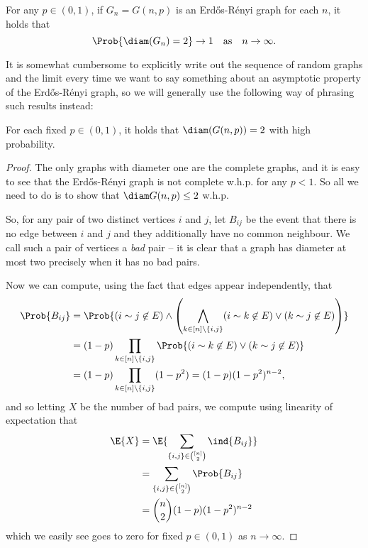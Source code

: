 \documentclass[nobib]{tufte-handout}
\begin{document}
\begin{proposition}
  For any $p \in (0,1)$, if $G_n = G(n,p)$ is an Erd\H{o}s-Rényi graph for each $n$, it holds that
  $$\Prob{\diam(G_n) = 2} \to 1\quad\text{as}\quad n \to \infty.$$
\end{proposition}

It is somewhat cumbersome to explicitly write out the sequence of random graphs and the limit every time we want to say something about an asymptotic property of the Erd\H{o}s-Rényi graph, so we will generally use the following way of phrasing such results instead:

\begin{proposition}
  For each fixed $p \in (0,1)$, it holds that $\diam(G(n,p)) = 2$ with high probability.

  \begin{proof}
    The only graphs with diameter one are the complete graphs, and it is easy to see that the Erd\H{o}s-Rényi graph is not complete w.h.p. for any $p < 1$. So all we need to do is to show that $\diam G(n,p) \leq 2$ w.h.p.

    So, for any pair of two distinct vertices $i$ and $j$, let $B_{ij}$ be the event that there is no edge between $i$ and $j$ and they additionally have no common neighbour. We call such a pair of vertices a \emph{bad} pair -- it is clear that a graph has diameter at most two precisely when it has no bad pairs.
    
    Now we can compute, using the fact that edges appear independently, that
    \begin{align*}
      \Prob{B_{ij}} &= \Prob{\left(i \sim j \not\in E\right) \wedge \left(\bigwedge_{k \in [n]\setminus \{i,j\}} (i \sim k \not\in E)\vee (k \sim j \not \in E)\right)}\\
      &= (1-p)\prod_{k \in [n] \setminus \{i,j\}} \Prob{(i \sim k \not\in E)\vee (k \sim j \not \in E)}\\
      &= (1-p)\prod_{k \in [n] \setminus \{i,j\}} (1 - p^2) = (1-p)(1 - p^2)^{n-2},
    \end{align*}
    and so letting $X$ be the number of bad pairs, we compute using linearity of expectation that
    \begin{align*}
      \E{X} &= \E{\sum_{\{i,j\} \in \binom{[n]}{2}} \ind{B_{ij}}}\\
      &= \sum_{\{i,j\} \in \binom{[n]}{2}} \Prob{B_{ij}}\\
      &= \binom{n}{2}(1-p)(1 - p^2)^{n-2}
    \end{align*}
    which we easily see goes to zero for fixed $p \in (0,1)$ as $n \to \infty$.


\end{proof}
\end{proposition}
\end{document}
